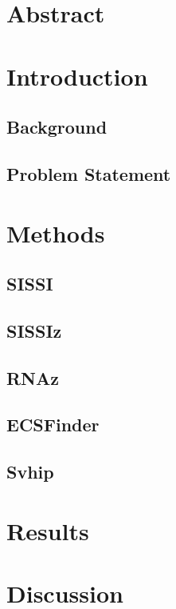 \documentclass{article}
\title{}
\author{Stefan Redl}
\begin{document}
\begin{large}

\maketitle
\tableofcontents

\section{Abstract}
\section{Introduction}
\subsection{Background}
\subsection{Problem Statement}
\section{Methods}
\subsection{SISSI}
\subsection{SISSIz}
\subsection{RNAz}
\subsection{ECSFinder}
\subsection{Svhip}
\section{Results}
\section{Discussion}































\end{large}
\end{document}
